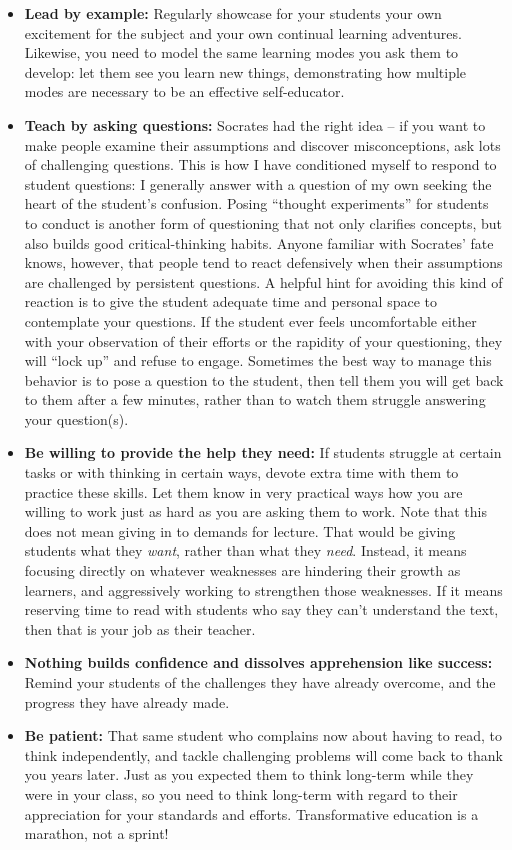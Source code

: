 \begin{itemize}
\item \textbf{Lead by example:} Regularly showcase for your students your own excitement for the subject and your own continual learning adventures.  Likewise, you need to model the same learning modes you ask them to develop: let them see you learn new things, demonstrating how multiple modes are necessary to be an effective self-educator.
\item \textbf{Teach by asking questions:} Socrates had the right idea -- if you want to make people examine their assumptions and discover misconceptions, ask lots of challenging questions.  This is how I have conditioned myself to respond to student questions: I generally answer with a question of my own seeking the heart of the student's confusion.  Posing ``thought experiments'' for students to conduct is another form of questioning that not only clarifies concepts, but also builds good critical-thinking habits.  Anyone familiar with Socrates' fate knows, however, that people tend to react defensively when their assumptions are challenged by persistent questions.  A helpful hint for avoiding this kind of reaction is to give the student adequate time and personal space to contemplate your questions.  If the student ever feels uncomfortable either with your observation of their efforts or the rapidity of your questioning, they will ``lock up'' and refuse to engage.  Sometimes the best way to manage this behavior is to pose a question to the student, then tell them you will get back to them after a few minutes, rather than to watch them struggle answering your question(s).  
\item \textbf{Be willing to provide the help they need:} If students struggle at certain tasks or with thinking in certain ways, devote extra time with them to practice these skills.  Let them know in very practical ways how you are willing to work just as hard as you are asking them to work.  Note that this does not mean giving in to demands for lecture.  That would be giving students what they \textit{want}, rather than what they \textit{need}.  Instead, it means focusing directly on whatever weaknesses are hindering their growth as learners, and aggressively working to strengthen those weaknesses.  If it means reserving time to read with students who say they can't understand the text, then that is your job as their teacher.
\item \textbf{Nothing builds confidence and dissolves apprehension like success:} Remind your students of the challenges they have already overcome, and the progress they have already made.
\item \textbf{Be patient:} That same student who complains now about having to read, to think independently, and tackle challenging problems will come back to thank you years later.  Just as you expected them to think long-term while they were in your class, so you need to think long-term with regard to their appreciation for your standards and efforts.  Transformative education is a marathon, not a sprint!
\end{itemize}







